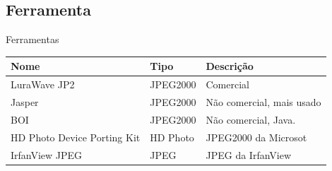 \documentclass{beamer}
\begin{document}
\subsection{Ferramenta}
\begin{frame}{Ferramentas}
   \begin{tabular}{| l | l | l |}
      \hline
      \textbf{Nome} & \textbf{Tipo} & \textbf{Descrição} \\
      \hline
      LuraWave JP2 & JPEG2000 & Comercial \\
      \hline
      Jasper & JPEG2000 & Não comercial, mais usado \\
      \hline
      BOI & JPEG2000 & Não comercial, Java. \\
      \hline
      HD Photo Device Porting Kit & HD Photo & JPEG2000 da Microsot \\
      \hline
      IrfanView JPEG & JPEG & JPEG da IrfanView \\
      \hline
   \end{tabular}
\end{frame}
\end{document}
